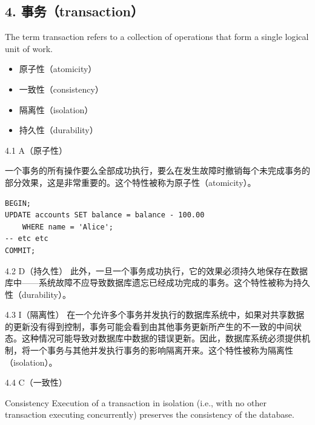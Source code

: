 \documentclass[aspectratio=169, 14pt]{beamer}
\begin{document}
\begin{frame}
	\section{\textcolor{darkmidnightblue}{4. 事务（transaction）}}
	The term \alert{transaction} refers to a collection of operations that form a single logical unit of work.
	\begin{itemize}
		\item 原子性（atomicity）
		\item 一致性（consistency）
		\item 隔离性（isolation）
		\item 持久性（durability）
	\end{itemize}

\end{frame}

\begin{frame}[fragile]{4.1 A（原子性）}

	一个事务的所有操作要么全部成功执行，要么在发生故障时撤销每个未完成事务的部分效果，这是非常重要的。这个特性被称为原子性（atomicity）。

	\begin{verbatim}
BEGIN;
UPDATE accounts SET balance = balance - 100.00
    WHERE name = 'Alice';
-- etc etc
COMMIT;
\end{verbatim}
\end{frame}

\begin{frame}[fragile]{4.2 D（持久性）}
	此外，一旦一个事务成功执行，它的效果必须持久地保存在数据库中——系统故障不应导致数据库遗忘已经成功完成的事务。这个特性被称为持久性（durability）。
\end{frame}


\begin{frame}[fragile]{4.3 I（隔离性）}
	在一个允许多个事务并发执行的数据库系统中，如果对共享数据的更新没有得到控制，事务可能会看到由其他事务更新所产生的不一致的中间状态。这种情况可能导致对数据库中数据的错误更新。因此，数据库系统必须提供机制，将一个事务与其他并发执行事务的影响隔离开来。这个特性被称为隔离性（isolation）。
\end{frame}

\begin{frame}[fragile]{4.4 C（一致性）}
	\begin{block}{Consistency}
		Execution of a transaction in isolation (i.e., with no other transaction executing concurrently) preserves the consistency of the database.
	\end{block}
\end{frame}
\end{document}
